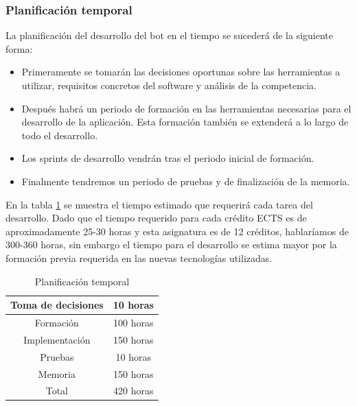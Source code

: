\subsubsection{Planificación temporal}

La planificación del desarrollo del bot en el tiempo se sucederá de la siguiente forma:

\begin{itemize}
    \item Primeramente se tomarán las decisiones oportunas sobre las herramientas a utilizar, requisitos concretos del software y análisis de la competencia.
    \item Después habrá un periodo de formación en las herramientas necesarias para el desarrollo de la aplicación. Esta formación también se extenderá a lo largo de todo el desarrollo.
    \item Los sprints de desarrollo vendrán tras el periodo inicial de formación.
    \item Finalmente tendremos un periodo de pruebas y de finalización de la memoria.
\end{itemize}

En la tabla \ref{tab:planificacionTemporal} se muestra el tiempo estimado que requerirá cada tarea del desarrollo. Dado que el tiempo requerido para cada crédito ECTS es de aproximadamente 25-30 horas y esta asignatura es de 12 créditos, hablaríamos de 300-360 horas, sin embargo el tiempo para el desarrollo se estima mayor por la formación previa requerida en las nuevas tecnologías utilizadas.

\begin{table}[]
    \centering
    \begin{tabular}{|c|c|}
        \hline
        Toma de decisiones & 10 horas \\
        \hline
        Formación   & 100 horas \\
        \hline
        Implementación & 150 horas \\
        \hline
        Pruebas & 10 horas \\
        \hline
        Memoria & 150 horas \\
        \hline
        \hline
        Total & 420 horas \\
        \hline
    \end{tabular}
    \caption{Planificación temporal}
    \label{tab:planificacionTemporal}
\end{table}



